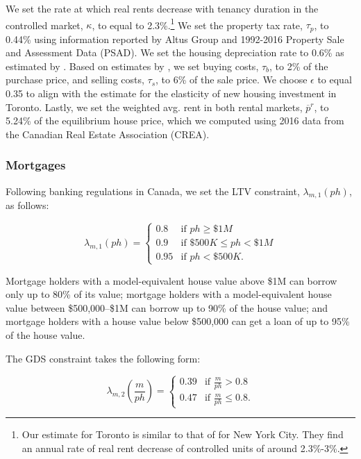 \documentclass[parskip=full]{article}
\begin{document}
We set the rate at which real rents decrease with tenancy duration in the controlled market, $\kappa$, to equal to 2.3\%.\footnote{Our estimate for Toronto is similar to that of \citet{fmn-2022} for New York City. They find an annual rate of real rent decrease of controlled units of around 2.3\%-3\%.} We set the property tax rate, $\tau_p$, to 0.44\% using information reported by Altus Group and 1992-2016 Property Sale and Assessment Data (PSAD). We set the housing depreciation rate to 0.6\% as estimated by \citet{rosenthal-2014}. Based on estimates by \citet{gm-2003}, we set buying costs, $\tau_{b}$, to 2\% of the purchase price, and selling costs, $\tau_{s}$, to 6\% of the sale price. We choose $\epsilon$ to equal 0.35 to align with the \citet{cmhc-report-2018} estimate for the elasticity of new housing investment in Toronto. Lastly, we set the weighted avg. rent in both rental markets, $\overline{p}^{r}$, to 5.24\% of the equilibrium house price, which we computed using 2016 data from the Canadian Real Estate Association (CREA).

\subsubsection{Mortgages}

Following banking regulations in Canada, we set the LTV constraint, $\lambda_{m,1}(ph)$, as follows:

\begin{equation*}
\lambda_{m,1}(ph) = \begin{cases}
0.8 &\text{if $ph\geq \$1M$}\\
0.9 &\text{if $\$500K\leq ph< \$1M$}\\
0.95 &\text{if $ph < \$500K$}.
\end{cases}
\end{equation*}

\noindent Mortgage holders with a model-equivalent house value above \$1M can borrow only up to 80\% of its value; mortgage holders with a model-equivalent house value between \$500,000--\$1M can borrow up to 90\% of the house value; and mortgage holders with a house value below \$500,000 can get a loan of up to 95\% of the house value. 

The GDS constraint takes the following form:

\begin{equation*}
\lambda_{m,2}\left(\frac{m}{ph}\right) = \begin{cases}
0.39 &\text{if $\frac{m}{ph}>0.8$}\\
0.47 &\text{if $\frac{m}{ph}\leq 0.8$}.
\end{cases}
\end{equation*}
\end{document}
